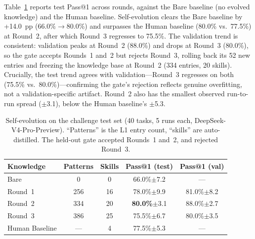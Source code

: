 Table~\ref{tab:sevolution} reports test Pass@1 across rounds, against the Bare baseline (no evolved knowledge) and the Human baseline. Self-evolution clears the Bare baseline by +14.0~pp (66.0\%$\to$80.0\%) and surpasses the Human baseline (80.0\% vs.\ 77.5\%) at Round~2, after which Round~3 regresses to 75.5\%. The validation trend is consistent: validation peaks at Round~2 (88.0\%) and drops at Round~3 (80.0\%), so the gate accepts Rounds~1 and~2 but rejects Round~3, rolling back its 52 new entries and freezing the knowledge base at Round~2 (334 entries, 20 skills). Crucially, the test trend agrees with validation—Round~3 regresses on both (75.5\% vs.\ 80.0\%)—confirming the gate's rejection reflects genuine overfitting, not a validation-specific artifact. Round~2 also has the smallest observed run-to-run spread ($\pm$3.1), below the Human baseline's $\pm$5.3.

\begin{table}[ht]
\caption{Self-evolution on the challenge test set (40 tasks, 5 runs each, DeepSeek-V4-Pro-Preview). ``Patterns'' is the L1 entry count, ``skills'' are auto-distilled. The held-out gate accepted Rounds~1 and~2, and rejected Round~3.}
\label{tab:sevolution}
\setlength{\tabcolsep}{2.5pt}
\centering
\small
\begin{tabular}{lcccc}
\toprule
Knowledge & Patterns & Skills & Pass@1 (test) & Pass@1 (val) \\
\midrule
Bare          & 0   & 0  & 66.0\%$\pm$7.2  & --- \\
Round~1 & 256 & 16 & 78.0\%$\pm$9.9  & 81.0\%$\pm$8.2 \\
Round~2 & 334 & 20 & \textbf{80.0\%}$\pm$3.1  & 88.0\%$\pm$2.7 \\
Round~3 & 386 & 25 & 75.5\%$\pm$6.7  & 80.0\%$\pm$3.5 \\
\midrule
Human Baseline & --- & 4  & 77.5\%$\pm$5.3  & --- \\
\bottomrule
\end{tabular}
\end{table}


